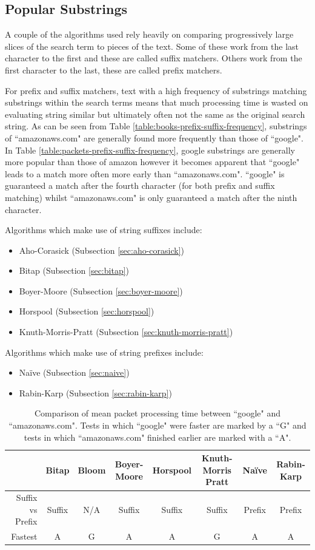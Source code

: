 \documentclass{article}
\begin{document}
\subsection{Popular Substrings}

A couple of the algorithms used rely heavily on comparing progressively large slices of the search term to pieces of the text. Some of these work from the last character to the first and these are called suffix matchers. Others work from the first character to the last, these are called prefix matchers. 

For prefix and suffix matchers, text with a high frequency of substrings matching substrings within the search terms means that much processing time is wasted on evaluating string similar but ultimately often not the same as the original search string. As can be seen from Table \ref{table:books-prefix-suffix-frequency}, substrings of ``amazonaws.com" are generally found more frequently than those of ``google". In Table \ref{table:packets-prefix-suffix-frequency}, google substrings are generally more popular than those of amazon however it becomes apparent that ``google" leads to a match more often more early than ``amazonaws.com". ``google" is guaranteed a match after the fourth character (for both prefix and suffix matching) whilst ``amazonaws.com" is only guaranteed a match after the ninth character.

Algorithms which make use of string suffixes include:
\begin{itemize}
  \item Aho-Corasick (Subsection \ref{sec:aho-corasick})
  \item Bitap (Subsection \ref{sec:bitap})
  \item Boyer-Moore (Subsection \ref{sec:boyer-moore})
  \item Horspool (Subsection \ref{sec:horspool})
  \item Knuth-Morris-Pratt (Subsection \ref{sec:knuth-morris-pratt})
\end{itemize}

Algorithms which make use of string prefixes include:
\begin{itemize}
  \item Na{\"i}ve (Subsection \ref{sec:naive})
  \item Rabin-Karp (Subsection \ref{sec:rabin-karp})
\end{itemize}

\begin{table}[h!bt]
  \centering
  \begin{tabular}{r|ccccccc}
    & Bitap & Bloom & Boyer-Moore & Horspool & Knuth-Morris Pratt & Na{\"i}ve & Rabin-Karp\\
    \hline
    Suffix vs Prefix & Suffix & N/A & Suffix & Suffix & Suffix & Prefix & Prefix \\ 
    Fastest & A & G & A & A & G & A & A
  \end{tabular}
  \caption{Comparison of mean packet processing time between ``google" and ``amazonaws.com". Tests in which ``google" were faster are marked by a ``G" and tests in which ``amazonaws.com" finished earlier are marked with a ``A".}
  \label{table:packet-mean-comparison}
\end{table}
\end{document}
